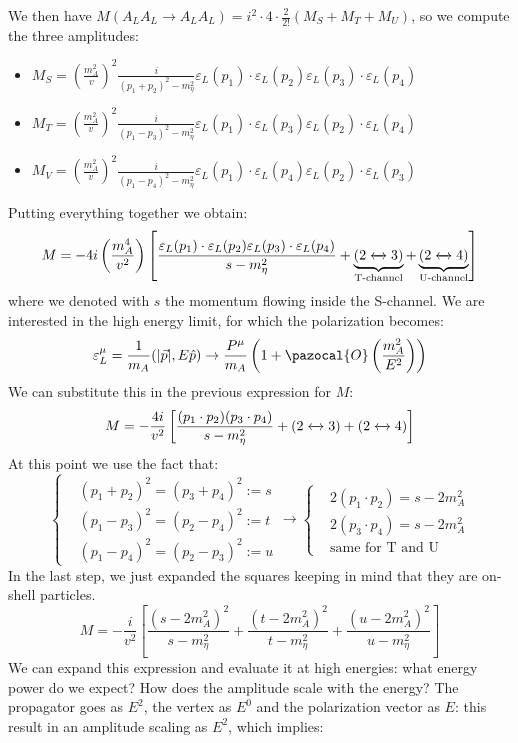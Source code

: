 \documentclass[../main.tex]{subfiles}
\begin{document}
We then have $M(A_LA_L\to A_LA_L)=i^2\cdot4\cdot\frac{2}{2!}(M_S+M_T+M_U)$, so we compute the three amplitudes:
\begin{itemize}
    \item $M_S=\left(\frac{m_A^2}{v}\right)^2\frac{i}{(p_1+p_2)^2-m_\eta^2}\varepsilon_L(p_1)\cdot\varepsilon_L(p_2)\varepsilon_L(p_3)\cdot\varepsilon_L(p_4)$
    \item $M_T=\left(\frac{m_A^2}{v}\right)^2\frac{i}{(p_1-p_3)^2-m_\eta^2}\varepsilon_L(p_1)\cdot\varepsilon_L(p_3)\varepsilon_L(p_2)\cdot\varepsilon_L(p_4)$
    \item $M_V=\left(\frac{m_A^2}{v}\right)^2\frac{i}{(p_1-p_4)^2-m_\eta^2}\varepsilon_L(p_1)\cdot\varepsilon_L(p_4)\varepsilon_L(p_2)\cdot\varepsilon_L(p_3)$
\end{itemize}
Putting everything together we obtain:
\[
M=-4i\left(\frac{m_A^4}{v^2}\right)\left[\frac{\varepsilon_L(p_1)\cdot\varepsilon_L(p_2)\varepsilon_L(p_3)\cdot\varepsilon_L(p_4)}{s-m_\eta^2}+\underbrace{(2\xleftrightarrow[]{}3)}_{\text{T-channel}}+\underbrace{(2\xleftrightarrow[]{}4)}_{\text{U-channel}}\right]
\]
where we denoted with $s$ the momentum flowing inside the S-channel. We are interested in the high energy limit, for which the polarization becomes:
\[
\varepsilon_L^\mu=\frac{1}{m_A}(|\Vec{p}|,E\hat{p})\to\frac{P^\mu}{m_A}\left(1+\pazocal{O}\left(\frac{m_A^2}{E^2}\right)\right)
\]
We can substitute this in the previous expression for $M$:
\[
M=-\frac{4i}{v^2}\left[\frac{(p_1\cdot p_2)(p_3\cdot p_4)}{s-m_\eta^2}+(2\xleftrightarrow[]{}3)+(2\xleftrightarrow[]{}4)\right]
\]
At this point we use the fact that:
\[
\left\{
\begin{aligned}
&(p_1+p_2)^2=(p_3+p_4)^2:=s\\
&(p_1-p_3)^2=(p_2-p_4)^2:=t\\
&(p_1-p_4)^2=(p_2-p_3)^2:=u
\end{aligned}
\right.
\to
\left\{
\begin{aligned}
&2(p_1\cdot p_2)=s-2m_A^2\\    
&2(p_3\cdot p_4)=s-2m_A^2\\
&\text{same for T and U}
\end{aligned}
\right.
\]
In the last step, we just expanded the squares keeping in mind that they are on-shell particles.
\[
M=-\frac{i}{v^2}\left[\frac{(s-2m_A^2)^2}{s-m_\eta^2}+\frac{(t-2m_A^2)^2}{t-m_\eta^2}+\frac{(u-2m_A^2)^2}{u-m_\eta^2}\right]
\]
We can expand this expression and evaluate it at high energies: what energy power do we expect? How does the amplitude scale with the energy? The propagator goes as $E^2$, the vertex as $E^0$ and the polarization vector as $E$: this result in an amplitude scaling as $E^2$, which implies:
\end{document}
